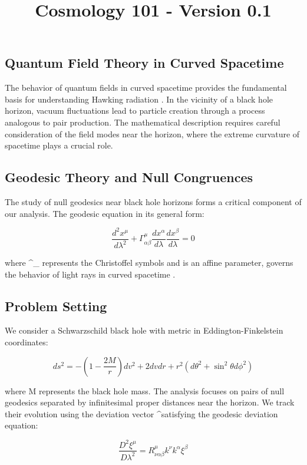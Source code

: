 \documentclass{article}\usepackage{graphicx} \usepackage{amsmath} \usepackage{colortbl}\title{Cosmology 101 - Version 0.1}
\begin{document}
\subsection{Quantum Field Theory in Curved Spacetime}
The behavior of quantum fields in curved spacetime provides the fundamental basis for understanding Hawking radiation \cite{hawking1975}. In the vicinity of a black hole horizon, vacuum fluctuations lead to particle creation through a process analogous to pair production. The mathematical description requires careful consideration of the field modes near the horizon, where the extreme curvature of spacetime plays a crucial role.

\subsection{Geodesic Theory and Null Congruences}
The study of null geodesics near black hole horizons forms a critical component of our analysis. The geodesic equation in its general form:

\begin{equation}
\frac{d^2x^\mu}{d\lambda^2} + \Gamma^\mu_{\alpha\beta}\frac{dx^\alpha}{d\lambda}\frac{dx^\beta}{d\lambda} = 0
\end{equation}

where \Gamma^\mu_{\alpha\beta} represents the Christoffel symbols and \lambda is an affine parameter, governs the behavior of light rays in curved spacetime \cite{parker1969}.

\subsection{Problem Setting}
We consider a Schwarzschild black hole with metric in Eddington-Finkelstein coordinates:

\begin{equation}
ds^2 = -(1-\frac{2M}{r})dv^2 + 2dvdr + r^2(d\theta^2 + \sin^2\theta d\phi^2)
\end{equation}

where M represents the black hole mass. The analysis focuses on pairs of null geodesics separated by infinitesimal proper distances near the horizon. We track their evolution using the deviation vector \xi^\mu satisfying the geodesic deviation equation:

\begin{equation}
\frac{D^2\xi^\mu}{D\lambda^2} = R^\mu_{\nu\alpha\beta}k^\nu k^\alpha \xi^\beta
\end{equation}
\end{document}
